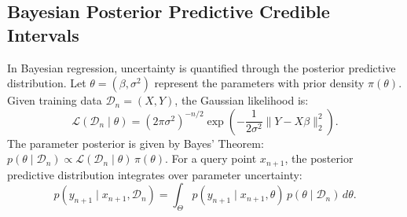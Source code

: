 \documentclass[journal]{IEEEtran}
\begin{document}
\subsection{Bayesian Posterior Predictive Credible Intervals}
In Bayesian regression, uncertainty is quantified through the posterior predictive distribution. Let $\theta = (\beta, \sigma^2)$ represent the parameters with prior density $\pi(\theta)$. Given training data $\mathcal{D}_n = (X, Y)$, the Gaussian likelihood is:
\begin{equation}
\mathcal{L}(\mathcal{D}_n \mid \theta) = (2\pi \sigma^2)^{-n/2} \exp\left( -\frac{1}{2\sigma^2} \|Y - X\beta\|_2^2 \right).
\end{equation}
The parameter posterior is given by Bayes' Theorem: $p(\theta \mid \mathcal{D}_n) \propto \mathcal{L}(\mathcal{D}_n \mid \theta) \, \pi(\theta)$. For a query point $x_{n+1}$, the posterior predictive distribution integrates over parameter uncertainty:
\begin{equation}
p(y_{n+1} \mid x_{n+1}, \mathcal{D}_n) = \int_{\Theta} p(y_{n+1} \mid x_{n+1}, \theta) \, p(\theta \mid \mathcal{D}_n) \, d\theta.
\end{equation}
\end{document}
